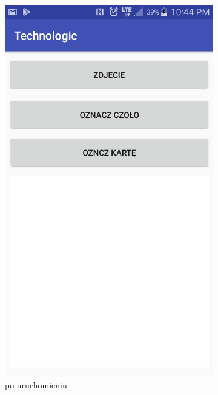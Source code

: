 \begin{figure}[H]
    \centering
        \begin{subfigure}{0.25\textwidth}
        \centering
        \includegraphics[width=\linewidth]{imgs/puste.png}
        \caption{po uruchomieniu}
        \label{fig:pustaAktywnosc}
    \end{subfigure}\hfill
    \begin{subfigure}{0.25\textwidth}
        \centering

\end{subfigure}
\end{figure}
